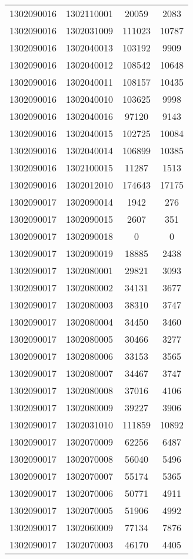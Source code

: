 \begin{longtable}[h]{llcc}
		1302090016 & 1302110001 & 20059 & 2083\\
		1302090016 & 1302031009 & 111023 & 10787\\
		1302090016 & 1302040013 & 103192 & 9909\\
		1302090016 & 1302040012 & 108542 & 10648\\
		1302090016 & 1302040011 & 108157 & 10435\\
		1302090016 & 1302040010 & 103625 & 9998\\
		1302090016 & 1302040016 & 97120 & 9143\\
		1302090016 & 1302040015 & 102725 & 10084\\
		1302090016 & 1302040014 & 106899 & 10385\\
		1302090016 & 1302100015 & 11287 & 1513\\
		1302090016 & 1302012010 & 174643 & 17175\\
		1302090017 & 1302090014 & 1942 & 276\\
		1302090017 & 1302090015 & 2607 & 351\\
		1302090017 & 1302090018 & 0 & 0\\
		1302090017 & 1302090019 & 18885 & 2438\\
		1302090017 & 1302080001 & 29821 & 3093\\
		1302090017 & 1302080002 & 34131 & 3677\\
		1302090017 & 1302080003 & 38310 & 3747\\
		1302090017 & 1302080004 & 34450 & 3460\\
		1302090017 & 1302080005 & 30466 & 3277\\
		1302090017 & 1302080006 & 33153 & 3565\\
		1302090017 & 1302080007 & 34467 & 3747\\
		1302090017 & 1302080008 & 37016 & 4106\\
		1302090017 & 1302080009 & 39227 & 3906\\
		1302090017 & 1302031010 & 111859 & 10892\\
		1302090017 & 1302070009 & 62256 & 6487\\
		1302090017 & 1302070008 & 56040 & 5496\\
		1302090017 & 1302070007 & 55174 & 5365\\
		1302090017 & 1302070006 & 50771 & 4911\\
		1302090017 & 1302070005 & 51906 & 4992\\
		1302090017 & 1302060009 & 77134 & 7876\\
		1302090017 & 1302070003 & 46170 & 4405\\

\end{longtable}

